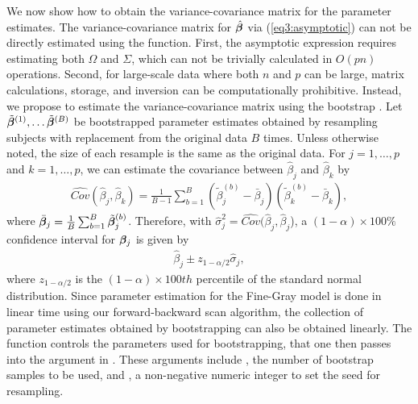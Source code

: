  
We now show how to obtain the variance-covariance matrix for the parameter estimates. The variance-covariance matrix for $\hat{\bm \beta}$ via (\ref{eq3:asymptotic}) can not be directly estimated using the  function. First, the asymptotic expression requires estimating both $\Omega$ and $\Sigma$, which can not be trivially calculated in $O(pn)$ operations. Second, for large-scale data where both $n$ and $p$ can be large, matrix calculations, storage, and inversion can be computationally prohibitive. Instead, we propose to estimate the variance-covariance matrix using the bootstrap \citep{efron1979bootstrap}.  Let $\tilde{\bm \beta}^{(1)}, \ldots \tilde{\bm \beta}^{(B)}$ be bootstrapped parameter estimates obtained by resampling subjects with replacement from the original data $B$ times. Unless otherwise noted, the size of each resample is the same as the original data. For $j = 1, \ldots, p$ and $k = 1, \ldots, p$, we can estimate the covariance between $\hat{\beta}_j$ and $\hat{\beta}_k$ by
 \begin{align}
\widehat{Cov}(\hat{\beta}_j, \hat{\beta}_k) = \frac{1}{B - 1} \sum_{b = 1}^B (\tilde{\beta}^{(b)}_{j} - \bar{\beta}_j)(\tilde{\beta}^{(b)}_{k} - \bar{\beta}_k),
\end{align}
where $\bar{\bm \beta}_j = \frac{1}{B} \sum_{b=1}^B \tilde{\bm \beta}^{(b)}_{j}$. Therefore, with $\hat{\sigma}^2_j = \widehat{Cov}(\hat{\beta}_j, \hat{\beta}_j$), a $(1 - \alpha) \times 100\%$ confidence interval for $\bm \beta_j$ is given by
\begin{align}
\hat{\beta}_j \pm z_{1-\alpha/2} \hat{\sigma}_j,
\end{align}
where $z_{1 - \alpha / 2}$ is the $(1 - \alpha) \times 100th$ percentile of the standard normal distribution. Since parameter estimation for the Fine-Gray model is done in linear time using our forward-backward scan algorithm, the collection of parameter estimates obtained by bootstrapping can also be obtained linearly. The  function controls the parameters used for bootstrapping, that one then passes into the  argument in . These arguments include , the number of bootstrap samples to be used, and , a non-negative numeric integer to set the seed for resampling. 



